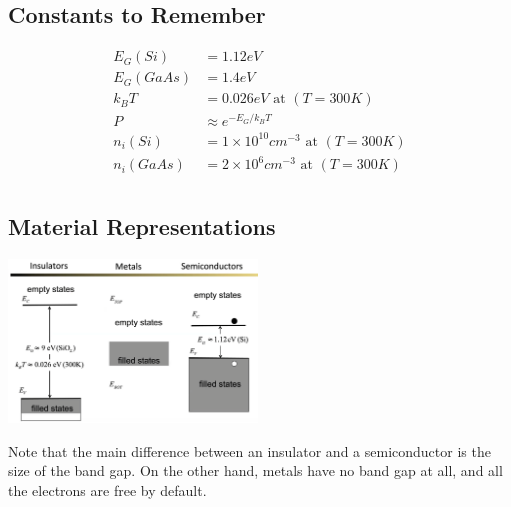 \documentclass[nobib]{tufte-handout}
\begin{document}
\subsection*{Constants to Remember}
\begin{align*}
    E_G(Si)   & = 1.12eV                                        \\
    E_G(GaAs) & = 1.4eV                                         \\
    k_B T     & = 0.026eV \text{ at }(T = 300K)                 \\
    P         & \approx e^{-E_G / k_B T}                        \\
    n_i(Si)   & = 1\times 10^{10} cm^{-3} \text{ at }(T = 300K) \\
    n_i(GaAs) & = 2\times 10^{6} cm^{-3} \text{ at }(T = 300K)  \\
\end{align*}
\subsection*{Material Representations}
\begin{center}
    \includegraphics*[width = 250px]{images/material_representations.png}
\end{center}
Note that the main difference between an insulator and a semiconductor is the size of the band gap. On the other hand, metals have no band gap at all, and all the electrons are free by default.\\
\end{document}
